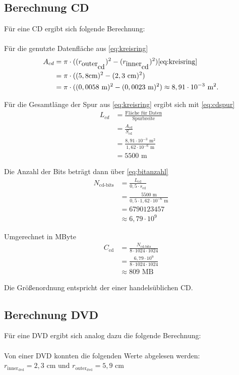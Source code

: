 \documentclass[9pt,twocolumn,twoside]{pnas-new}
\begin{document}
\subsection{Berechnung CD}
Für eine CD ergibt sich folgende Berechnung: \\ \\
Für die genutzte Datenfläche aus \eqref{eq:kreisring}
\begin{align*}
 A_{cd} &= \pi\cdot((r_{\mbox{outer}_{\mbox{cd}}})^2-(r_{\mbox{inner}_{\mbox{cd}}})^2)  \ref{eq:kreisring}\\	
&= \pi\cdot((5,8\mbox{cm})^2-(2,3\mbox{ cm})^2) \\
 &=  \pi\cdot((0,0058\mbox{ m})^2-(0,0023\mbox{ m})^2) \approx  8,91\cdot10^{-3}\mbox{ m}^2.
\end{align*}

Für die Gesamtlänge der Spur aus \ref{eq:kreisring} ergibt sich mit \eqref{eq:cdspur}
\begin{align*}
 L_{cd} &= \frac{\mbox{Fläche für Daten}}{\mbox{Spurbreite}}\\
 &= \frac{A_{\mbox{cd}}}{S_{\mbox{cd}}}\\
 &= \frac{8,91\cdot10^{-3}\mbox{ m}^2}{1,62\cdot10^{-6}\mbox{ m} }\\
 &= 5500\mbox{ m}
\end{align*}

Die Anzahl der Bits beträgt dann über \eqref{eq:bitanzahl}
\begin{align*}
N_{\mbox{cd-bits}} &=  \frac{L_{\mbox{cd}}}{0,5\cdot s_{\mbox{cd}}}\\
&= \frac{5500\mbox{ m}}{0,5 \cdot 1,62 \cdot 10^{-6}\mbox{ m}}\\
&= 6790123457 \\
&\approx 6,79 \cdot 10^9
\end{align*}

Umgerechnet in MByte
\begin{align*}
C_{\mbox{cd}} &= \frac{N_{\mbox{cd-bits}}}{8\cdot1024\cdot1024}\\
&= \frac{ 6,79\cdot10^9}{8\cdot1024\cdot1024}\\
&\approx 809\mbox{ MB}
\end{align*}

Die Größenordnung entspricht der einer handelsüblichen CD.

\subsection{Berechnung DVD}
Für eine DVD ergibt sich analog dazu die folgende Berechnung: \\ \\
Von einer DVD konnten die folgenden Werte abgelesen werden: \begin{math} r_{\mbox{inner}_{\mbox{dvd}}} = 2,3 \mbox{ cm und } r_{\mbox{outer}_{\mbox{dvd}}} = 5,9 \mbox{ cm} \end{math} \\
\end{document}
